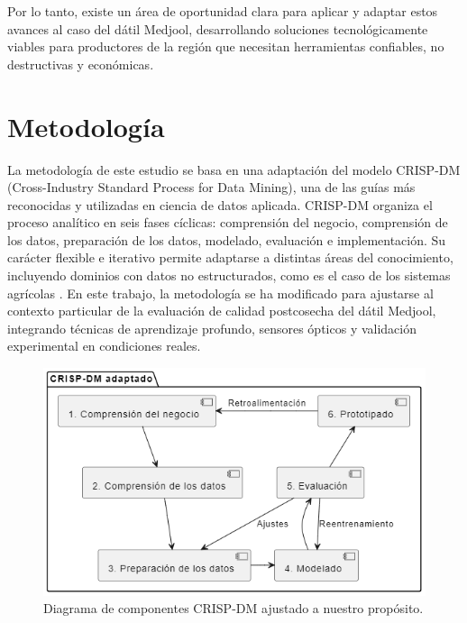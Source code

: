 Por lo tanto, existe un área de oportunidad clara para aplicar y adaptar estos avances al caso del dátil Medjool, desarrollando soluciones tecnológicamente viables para productores de la región que necesitan herramientas confiables, no destructivas y económicas.

\newpage


\section{Metodología}

La metodología de este estudio se basa en una adaptación del modelo CRISP-DM (Cross-Industry Standard Process for Data Mining), una de las guías más reconocidas y utilizadas en ciencia de datos aplicada. CRISP-DM organiza el proceso analítico en seis fases cíclicas: comprensión del negocio, comprensión de los datos, preparación de los datos, modelado, evaluación e implementación. Su carácter flexible e iterativo permite adaptarse a distintas áreas del conocimiento, incluyendo dominios con datos no estructurados, como es el caso de los sistemas agrícolas \parencite{shimaoka_evolution_2024, saltz_crisp-dm_2021}. En este trabajo, la metodología se ha modificado para ajustarse al contexto particular de la evaluación de calidad postcosecha del dátil Medjool, integrando técnicas de aprendizaje profundo, sensores ópticos y validación experimental en condiciones reales.

\begin{figure}[th]
\centering
\includegraphics[scale=0.75]{Figures/componentes.png}
\decoRule
\caption{Diagrama de componentes CRISP-DM ajustado a nuestro propósito.}
\label{fig:Componentes_CRISP-DM}
\end{figure}

